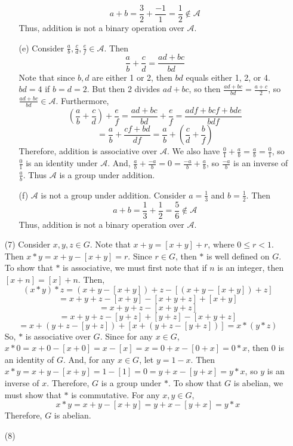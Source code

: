\documentclass[12pt]{article}
\begin{document}
\begin{itemize}
\begin{itemize}
$$a + b = \frac{3}{2} + \frac{-1}{1} = \frac{1}{2} \not \in \mathcal{A}$$
Thus, addition is not a binary operation over $\mathcal{A}$.
\item[(e)]
Consider $\frac{a}{b}, \frac{c}{d}, \frac{e}{f} \in \mathcal{A}$. Then
$$\frac{a}{b} + \frac{c}{d} = \frac{ad + bc}{bd}$$
Note that since $b, d$ are either 1 or 2, then $bd$ equals either 1, 2, or 4. $bd = 4$ if $b = d = 2$. But then 2 divides $ad + bc$, so then $\frac{ad + bc}{bd} = \frac{a + c}{2}$, so $\frac{ad + bc}{bd} \in \mathcal{A}$. Furthermore, 
$$\left(\frac{a}{b} + \frac{c}{d} \right) + \frac{e}{f} = \frac{ad + bc}{bd} + \frac{e}{f} = \frac{adf + bcf + bde}{bdf}$$
$$ = \frac{a}{b} + \frac{cf + bd}{df} = \frac{a}{b} + \left(\frac{c}{d} + \frac{b}{f}\right)$$
Therefore, addition is associative over $\mathcal{A}$. We also have $\frac{0}{1} + \frac{a}{b} = \frac{a}{b} = \frac{0}{1}$, so $\frac{0}{1}$ is an identity under $\mathcal{A}$. And, $\frac{a}{b} + \frac{-a}{b} = 0 = \frac{-a}{b} + \frac{a}{b}$, so $\frac{-a}{b}$ is an inverse of $\frac{a}{b}$. Thus $\mathcal{A}$ is a group under addition.
\item[(f)]
$\mathcal{A}$ is not a group under addition. Consider $a = \frac{1}{3}$ and $b = \frac{1}{2}$. Then
$$a + b = \frac{1}{3} + \frac{1}{2} = \frac{5}{6} \not \in \mathcal{A}$$
Thus, addition is not a binary operation over $\mathcal{A}$.
\end{itemize}
\item[(7)]
Consider $x, y, z \in G$. Note that $x + y = [x + y] + r$, where $0 \leq r < 1$. Then $x * y = x + y - [x + y] = r$. Since $r \in G$, then $*$ is well defined on $G$. To show that $*$ is associative, we must first note that if $n$ is an integer, then $[x + n] = [x] + n$. Then,
$$(x * y) * z = (x + y - [x + y]) + z - [(x + y - [x + y]) + z]$$
$$= x + y + z - [x + y] - [x + y + z] + [x + y]$$
$$= x + y + z - [x + y + z]$$
$$= x + y + z - [y + z] + [y + z] - [x + y + z]$$
$$= x + (y + z - [y + z]) + [x + (y + z - [y + z])] = x * (y * z)$$
So, $*$ is associative over $G$. Since for any $x \in G$, $x * 0 = x + 0 - [x + 0] = x - [x] = x = 0 + x - [0 + x] = 0 * x$, then $0$ is an identity of $G$. And, for any $x \in G$, let $y = 1 - x$. Then $x * y = x + y - [x + y] = 1 - [1] = 0 = y + x - [y + x] = y * x$, so $y$ is an inverse of $x$. Therefore, $G$ is a group under $*$. To show that $G$ is abelian, we must show that $*$ is commutative. For any $x, y \in G$,
$$x * y = x + y - [x + y] = y + x - [y + x] = y * x$$
Therefore, $G$ is abelian.
\item[(8)]
\begin{itemize}

\end{itemize}
\end{itemize}
\end{document}
